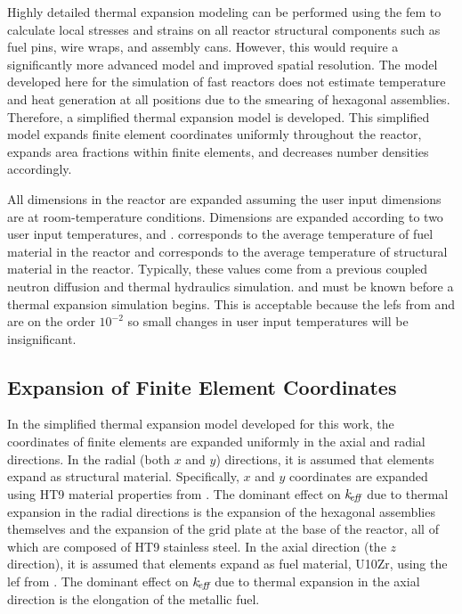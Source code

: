   Highly detailed thermal expansion modeling can be performed using the
  \gls{fem} to calculate local stresses and strains on all reactor
  structural components such as fuel pins, wire wraps, and assembly cans.
  However, this would require a significantly more advanced model and improved
  spatial resolution. The model developed here for the simulation of fast
  reactors does not estimate temperature and heat generation at all positions
  due to the smearing of hexagonal assemblies. Therefore, a simplified thermal
  expansion model is developed. This simplified model expands finite element
  coordinates uniformly throughout the reactor, expands area fractions within
  finite elements, and decreases number densities accordingly.

  All dimensions in the reactor are expanded assuming the user input
  dimensions are at room-temperature conditions. Dimensions are expanded
  according to two user input temperatures, \texpfuel and \texpstruct.
  \texpfuel corresponds to the average temperature of fuel material in the
  reactor and \texpstruct corresponds to the average temperature of structural
  material in the reactor. Typically, these values come from a previous
  coupled neutron diffusion and thermal hydraulics simulation. \texpfuel and
  \texpstruct must be known before a thermal expansion simulation begins. This
  is acceptable because the \glspl{lef} from  and
   are on the order $10^{-2}$ so small changes in
  user input temperatures will be insignificant.

  \subsection{Expansion of Finite Element Coordinates}
    \label{sec:expansion_of_fe_coordinates}
    In the simplified thermal expansion model developed for this work, the
    coordinates of finite elements are expanded uniformly in the axial and
    radial directions. In the radial (both $x$ and $y$) directions,
    it is assumed that elements expand as structural material. Specifically,
    $x$ and $y$ coordinates are expanded using HT9 material properties from
    . The dominant effect on $k_{\!\mbox{\scriptsize \em eff}}$ due to thermal expansion
    in the radial directions is the expansion of the hexagonal assemblies
    themselves and the expansion of the grid plate at the base of the reactor,
    all of which are composed of HT9 stainless steel. In the axial direction
    (the $z$ direction), it is assumed that elements expand as fuel material,
    U10Zr, using the \gls{lef} from . The dominant effect on
    $k_{\!\mbox{\scriptsize \em eff}}$ due to thermal expansion in the axial direction is the elongation of
    the metallic fuel.

